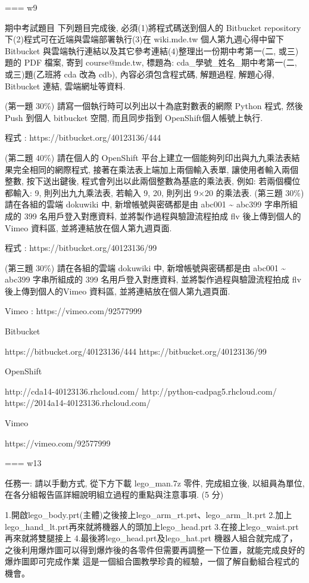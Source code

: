 \documentclass[]{article}
\begin{document}
=== w9

期中考試題目 下列題目完成後, 必須(1)將程式碼送到個人的 Bitbucket
repository 下(2)程式可在近端與雲端部署執行(3)在 wiki.mde.tw
個人第九週心得中留下 Bitbucket
與雲端執行連結以及其它參考連結(4)整理出一份期中考第一(二, 或三)題的 PDF
檔案, 寄到 course@mde.tw, 標題為: cda\_學號\_姓名\_期中考第一(二,
或三)題(乙班將 cda 改為 cdb), 內容必須包含程式碼, 解題過程, 解題心得,
Bitbucket 連結, 雲端網址等資料.

(第一題 30\%) 請寫一個執行時可以列出以十為底對數表的網際 Python 程式,
然後 Push 到個人 bitbucket 空間, 而且同步指到 OpenShift個人帳號上執行.

程式 : https://bitbucket.org/40123136/444

(第二題 40\%) 請在個人的 OpenShift
平台上建立一個能夠列印出與九九乘法表結果完全相同的網際程式,
接著在乘法表上端加上兩個輸入表單, 讓使用者輸入兩個整數, 按下送出鍵後,
程式會列出以此兩個整數為基底的乘法表, 例如: 若兩個欄位都輸入: 9,
則列出九九乘法表, 若輸入 9, 20, 則列出 9×20 的乘法表. (第三題 30\%)
請在各組的雲端 dokuwiki 中, 新增帳號與密碼都是由 abc001
\textasciitilde{} abc399 字串所組成的 399 名用戶登入對應資料,
並將製作過程與驗證流程拍成 flv 後上傳到個人的 Vimeo 資料區,
並將連結放在個人第九週頁面.

程式 : https://bitbucket.org/40123136/99

(第三題 30\%) 請在各組的雲端 dokuwiki 中, 新增帳號與密碼都是由 abc001
\textasciitilde{} abc399 字串所組成的 399 名用戶登入對應資料,
並將製作過程與驗證流程拍成 flv 後上傳到個人的Vimeo 資料區,
並將連結放在個人第九週頁面.

Vimeo : https://vimeo.com/92577999

Bitbucket

https://bitbucket.org/40123136/444 https://bitbucket.org/40123136/99

OpenShift

http://cda14-40123136.rhcloud.com/ http://python-cadpag5.rhcloud.com/
https://2014a14-40123136.rhcloud.com/

Vimeo

https://vimeo.com/92577999

=== w13

任務一: 請以手動方式, 從下方下載 lego\_man.7z 零件, 完成組立後,
以組員為單位, 在各分組報告區詳細說明組立過程的重點與注意事項. (5 分)

1.開啟lego\_body.prt(主體)之後接上lego\_arm\_rt.prt、lego\_arm\_lt.prt
2.加上lego\_hand\_lt.prt再來就將機器人的頭加上lego\_head.prt
3.在接上lego\_waist.prt再來就將雙腿接上
4.最後將lego\_head.prt及lego\_hat.prt 機器人組合就完成了，
之後利用爆炸圖可以得到爆炸後的各零件但需要再調整一下位置，就能完成良好的爆炸圖即可完成作業
這是一個組合圖教學珍貴的經驗，一個了解自動組合程式的機會。
\end{document}
